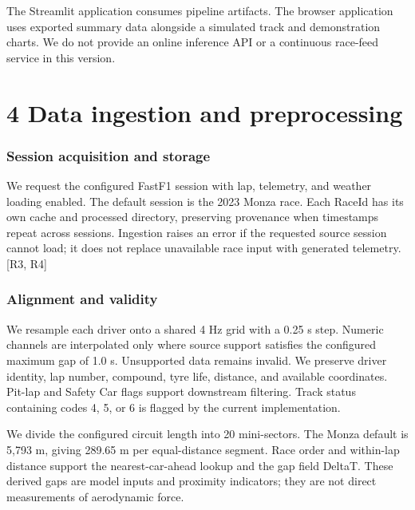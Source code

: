\documentclass[11pt,a4paper,oneside]{report}
\begin{document}
The Streamlit application consumes pipeline artifacts. The browser application uses exported summary data alongside a simulated track and demonstration charts. We do not provide an online inference API or a continuous race-feed service in this version.

\clearpage

\clearpage\chapter*{4 Data ingestion and preprocessing}

\subsection*{Session acquisition and storage}

We request the configured FastF1 session with lap, telemetry, and weather loading enabled. The default session is the 2023 Monza race. Each RaceId has its own cache and processed directory, preserving provenance when timestamps repeat across sessions. Ingestion raises an error if the requested source session cannot load; it does not replace unavailable race input with generated telemetry. [R3, R4]

\subsection*{Alignment and validity}

We resample each driver onto a shared 4 Hz grid with a 0.25 s step. Numeric channels are interpolated only where source support satisfies the configured maximum gap of 1.0 s. Unsupported data remains invalid. We preserve driver identity, lap number, compound, tyre life, distance, and available coordinates. Pit-lap and Safety Car flags support downstream filtering. Track status containing codes 4, 5, or 6 is flagged by the current implementation.

We divide the configured circuit length into 20 mini-sectors. The Monza default is 5,793 m, giving 289.65 m per equal-distance segment. Race order and within-lap distance support the nearest-car-ahead lookup and the gap field DeltaT. These derived gaps are model inputs and proximity indicators; they are not direct measurements of aerodynamic force.

\end{document}
